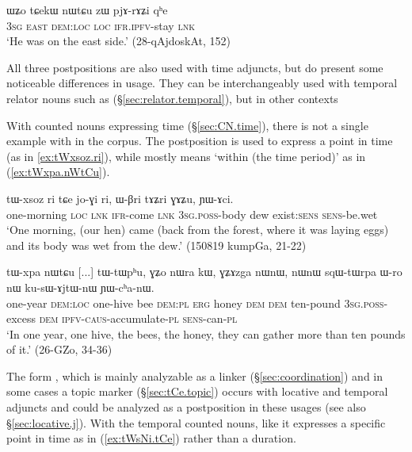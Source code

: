  \begin{exe}
\ex \label{ex:tCAkW.nWtCu.zW}
\gll   ɯʑo tɕekɯ nɯtɕu zɯ pjɤ-rɤʑi qʰe \\
\textsc{3sg} \textsc{east} \textsc{dem}:\textsc{loc} \textsc{loc} \textsc{ifr}.\textsc{ipfv}-stay \textsc{lnk}  \\
\glt `He was on the east side.' (28-qAjdoskAt, 152)
  \end{exe}
   
All three postpositions are also used with time adjuncts, but do present some noticeable differences in usage. They can be interchangeably used with temporal relator nouns such as  (§\ref{sec:relator.temporal}), but in other contexts 

With counted nouns expressing time (§\ref{sec:CN.time}), there is not a single example with  in the corpus. The postposition  is used to express a point in time  (as in \ref{ex:tWxsoz.ri}), while  mostly means `within (the time period)' as in (\ref{ex:tWxpa.nWtCu}).  

\begin{exe}
\ex \label{ex:tWxsoz.ri}
\gll tɯ-xsoz ri tɕe jo-ɣi ri, ɯ-βri tɤʑri ɣɤʑu, ɲɯ-ɤci. \\
one-morning \textsc{loc} \textsc{lnk} \textsc{ifr}-come \textsc{lnk} \textsc{3sg}.\textsc{poss}-body dew exist:\textsc{sens} \textsc{sens}-be.wet \\
\glt `One morning, (our hen) came (back from the forest, where it was laying eggs) and its body was wet from the dew.' (150819 kumpGa, 21-22)
\end{exe}

\begin{exe}
\ex \label{ex:tWxpa.nWtCu}
\gll  tɯ-xpa nɯtɕu [...] tɯ-tɯpʰu, ɣʑo nɯra kɯ, ɣʑɤzga nɯnɯ, nɯnɯ sqɯ-tɯrpa ɯ-ro nɯ ku-sɯ-ɤjtɯ-nɯ ɲɯ-cʰa-nɯ. \\
one-year \textsc{dem}:\textsc{loc} { } one-hive bee \textsc{dem}:\textsc{pl} \textsc{erg} honey \textsc{dem} \textsc{dem} ten-pound \textsc{3sg}.\textsc{poss}-excess \textsc{dem} \textsc{ipfv}-\textsc{caus}-accumulate-\textsc{pl} \textsc{sens}-can-\textsc{pl} \\
\glt  `In one year, one hive, the bees, the honey, they can gather more than ten pounds of it.' (26-GZo, 34-36)
\end{exe}

The form , which  is mainly analyzable as a linker (§\ref{sec:coordination}) and in some cases a topic marker (§\ref{sec:tCe.topic}) occurs with locative and temporal adjuncts and could be analyzed as a postposition in these usages (see also §\ref{sec:locative.j}). With the temporal counted nouns, like  it expresses a specific point in time as in (\ref{ex:tWsNi.tCe}) rather than a duration.

